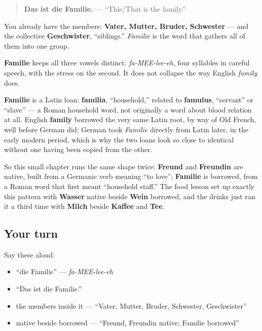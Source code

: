 \begin{quote}
\textbf{Das ist die Familie.} — \textquotedblleft{}This/That is the family.\textquotedblright{}
\end{quote}

You already have the members: \textbf{Vater, Mutter, Bruder, Schwester} — and the collective \textbf{Geschwister}, \textquotedblleft{}siblings.\textquotedblright{} \emph{Familie} is the word that gathers all of them into one group.

\begin{sounds}
\textbf{Familie} keeps all three vowels distinct: \emph{fa-MEE-lee-eh}, four syllables in careful speech, with the stress on the second. It does not collapse the way English \emph{family} does.
\end{sounds}

\begin{cousinweb}
\textbf{Familie} is a Latin loan: \textbf{familia}, \textquotedblleft{}household,\textquotedblright{} related to \textbf{famulus}, \textquotedblleft{}servant\textquotedblright{} or \textquotedblleft{}slave\textquotedblright{} — a Roman household word, not originally a word about blood relation at all. English \textbf{family} borrowed the very same Latin root, by way of Old French, well before German did; German took \emph{Familie} directly from Latin later, in the early modern period, which is why the two loans look so close to identical without one having been copied from the other.

So this small chapter runs the same shape twice: \textbf{Freund} and \textbf{Freundin} are native, built from a Germanic verb meaning \textquotedblleft{}to love\textquotedblright{}; \textbf{Familie} is borrowed, from a Roman word that first meant \textquotedblleft{}household staff.\textquotedblright{} The food lesson set up exactly this pattern with \textbf{Wasser} native beside \textbf{Wein} borrowed, and the drinks just ran it a third time with \textbf{Milch} beside \textbf{Kaffee} and \textbf{Tee}.
\end{cousinweb}

\subsection*{Your turn}
Say these aloud:

\begin{itemize}
\raggedright
  \item \textquotedblleft{}die Familie\textquotedblright{} — \emph{fa-MEE-lee-eh}
  \item \textquotedblleft{}Das ist die Familie.\textquotedblright{}
  \item the members inside it — \textquotedblleft{}Vater, Mutter, Bruder, Schwester, Geschwister\textquotedblright{}
  \item native beside borrowed — \textquotedblleft{}Freund, Freundin native; Familie borrowed\textquotedblright{}
\end{itemize}

